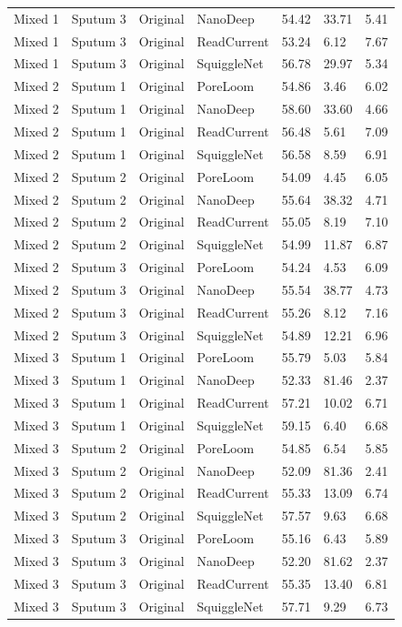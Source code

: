 \begin{longtable}{lllllll}
Mixed 1 & Sputum 3 & Original & NanoDeep & 54.42 & 33.71 & 5.41\\
Mixed 1 & Sputum 3 & Original & ReadCurrent & 53.24 & 6.12 & 7.67\\
Mixed 1 & Sputum 3 & Original & SquiggleNet & 56.78 & 29.97 & 5.34\\
Mixed 2 & Sputum 1 & Original & PoreLoom & 54.86 & 3.46 & 6.02\\
Mixed 2 & Sputum 1 & Original & NanoDeep & 58.60 & 33.60 & 4.66\\
Mixed 2 & Sputum 1 & Original & ReadCurrent & 56.48 & 5.61 & 7.09\\
Mixed 2 & Sputum 1 & Original & SquiggleNet & 56.58 & 8.59 & 6.91\\
Mixed 2 & Sputum 2 & Original & PoreLoom & 54.09 & 4.45 & 6.05\\
Mixed 2 & Sputum 2 & Original & NanoDeep & 55.64 & 38.32 & 4.71\\
Mixed 2 & Sputum 2 & Original & ReadCurrent & 55.05 & 8.19 & 7.10\\
Mixed 2 & Sputum 2 & Original & SquiggleNet & 54.99 & 11.87 & 6.87\\
Mixed 2 & Sputum 3 & Original & PoreLoom & 54.24 & 4.53 & 6.09\\
Mixed 2 & Sputum 3 & Original & NanoDeep & 55.54 & 38.77 & 4.73\\
Mixed 2 & Sputum 3 & Original & ReadCurrent & 55.26 & 8.12 & 7.16\\
Mixed 2 & Sputum 3 & Original & SquiggleNet & 54.89 & 12.21 & 6.96\\
Mixed 3 & Sputum 1 & Original & PoreLoom & 55.79 & 5.03 & 5.84\\
Mixed 3 & Sputum 1 & Original & NanoDeep & 52.33 & 81.46 & 2.37\\
Mixed 3 & Sputum 1 & Original & ReadCurrent & 57.21 & 10.02 & 6.71\\
Mixed 3 & Sputum 1 & Original & SquiggleNet & 59.15 & 6.40 & 6.68\\
Mixed 3 & Sputum 2 & Original & PoreLoom & 54.85 & 6.54 & 5.85\\
Mixed 3 & Sputum 2 & Original & NanoDeep & 52.09 & 81.36 & 2.41\\
Mixed 3 & Sputum 2 & Original & ReadCurrent & 55.33 & 13.09 & 6.74\\
Mixed 3 & Sputum 2 & Original & SquiggleNet & 57.57 & 9.63 & 6.68\\
Mixed 3 & Sputum 3 & Original & PoreLoom & 55.16 & 6.43 & 5.89\\
Mixed 3 & Sputum 3 & Original & NanoDeep & 52.20 & 81.62 & 2.37\\
Mixed 3 & Sputum 3 & Original & ReadCurrent & 55.35 & 13.40 & 6.81\\
Mixed 3 & Sputum 3 & Original & SquiggleNet & 57.71 & 9.29 & 6.73\\
\end{longtable}
